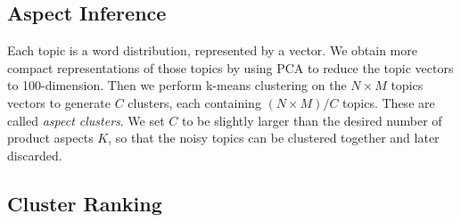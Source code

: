 \documentclass[10pt,final,conference,letterpaper]{IEEEtran}
\newcommand{\tabref}[1]{Table \ref{#1}}
\begin{document}
\subsection{Aspect Inference}
\label{sec:topic_clustering}
Each topic is a word distribution, represented by a vector. 
We obtain  more compact representations of those topics by using PCA to 
reduce the topic vectors to 100-dimension.
Then we perform k-means clustering on the $N\times M$ topics vectors to 
generate $C$ clusters, each containing $(N\times M)/C$ topics.
These are called {\em aspect clusters}.
We set $C$ to be slightly larger than the desired number of product 
aspects $K$, so that the noisy topics can be clustered together and 
later discarded. 
%
%

\subsection{Cluster Ranking}
\end{document}

